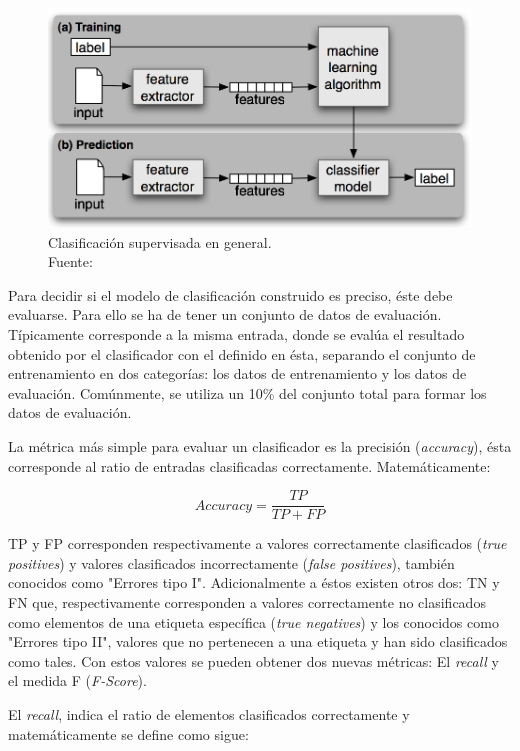 \begin{figure}[H]
	\centering
	\captionsetup{justification=centering}
	\includegraphics[scale=0.8]{images/TrainingPrediction.png}
	\caption[Clasificación supervisada en general.]{Clasificación supervisada en general.\\Fuente: \cite{NPLK}}
	\label{fig:NPLK}
\end{figure}

Para decidir si el modelo de clasificación construido es preciso, éste debe evaluarse. Para ello se ha de tener un conjunto de datos de evaluación. Típicamente corresponde a la misma entrada, donde se evalúa el resultado obtenido por el clasificador con el definido en ésta, separando el conjunto de entrenamiento en dos categorías: los datos de entrenamiento y los datos de evaluación. Comúnmente, se utiliza un 10\% del conjunto total para formar los datos de evaluación.

La métrica más simple para evaluar un clasificador es la precisión (\textit{accuracy}), ésta corresponde al ratio de entradas clasificadas correctamente. Matemáticamente:

\[
	Accuracy = \frac{TP}{TP+FP}
\]

TP y FP corresponden respectivamente a valores correctamente clasificados (\textit{true positives}) y valores clasificados incorrectamente (\textit{false positives}), también conocidos como "Errores tipo I". Adicionalmente a éstos existen otros dos: TN y FN que, respectivamente corresponden a valores correctamente no clasificados como elementos de una etiqueta específica (\textit{true negatives}) y los conocidos como "Errores tipo II", valores que no pertenecen a una etiqueta y han sido clasificados como tales. Con estos valores se pueden obtener dos nuevas métricas: El \textit{recall} y el medida F (\textit{F-Score}).

El \textit{recall}, indica el ratio de elementos clasificados correctamente y matemáticamente se define como sigue:

